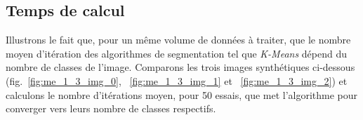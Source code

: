 


	 

\subsection*{Temps de calcul}
		Illustrons le fait que, pour un même volume de données à traiter, que le nombre moyen d'itération des algorithmes de segmentation tel que \emph{K-Means} dépend du nombre de classes de l'image. Comparons les trois images synthétiques ci-dessous (fig.~\ref{fig:me_1_3_img_0}, ~\ref{fig:me_1_3_img_1} et ~\ref{fig:me_1_3_img_2}) et calculons le nombre d'itérations moyen, pour 50 essais, que met l'algorithme pour converger vers leurs nombre de classes respectifs.
		
